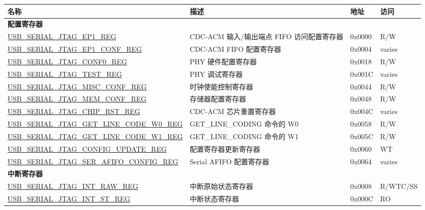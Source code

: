 \begin{longtable}{ | p{7.4cm} | p{5.2cm} | p{1.2cm} | p{1.7cm} | }
\hline\rowcolor{lightgray}
\textbf{名称} & \textbf{描述} &  \textbf{地址} & \textbf{访问} \\ \hline
\endhead
\multicolumn{4}{|l|}{\textbf{配置寄存器}} \\ \hline
\hyperref[regdesc:USBSERIALJTAGEP1REG]{USB\_SERIAL\_JTAG\_EP1\_REG} & CDC-ACM 输入/输出端点 FIFO 访问配置寄存器 & 0x0000 & R/W \\ \hline
\hyperref[regdesc:USBSERIALJTAGEP1CONFREG]{USB\_SERIAL\_JTAG\_EP1\_CONF\_REG} & CDC-ACM FIFO 配置寄存器 & 0x0004 & varies \\ \hline
\hyperref[regdesc:USBSERIALJTAGCONF0REG]{USB\_SERIAL\_JTAG\_CONF0\_REG} & PHY 硬件配置寄存器 & 0x0018 & R/W \\ \hline
\hyperref[regdesc:USBSERIALJTAGTESTREG]{USB\_SERIAL\_JTAG\_TEST\_REG} & PHY 调试寄存器 & 0x001C & varies \\ \hline
\hyperref[regdesc:USBSERIALJTAGMISCCONFREG]{USB\_SERIAL\_JTAG\_MISC\_CONF\_REG} & 时钟使能控制寄存器 & 0x0044 & R/W \\ \hline
\hyperref[regdesc:USBSERIALJTAGMEMCONFREG]{USB\_SERIAL\_JTAG\_MEM\_CONF\_REG} & 存储器配置寄存器 & 0x0048 & R/W \\ \hline
\hyperref[regdesc:USBSERIALJTAGCHIPRSTREG]{USB\_SERIAL\_JTAG\_CHIP\_RST\_REG} & CDC-ACM 芯片重置寄存器 & 0x004C & varies \\ \hline
\hyperref[regdesc:USBSERIALJTAGGETLINECODEW0REG]{USB\_SERIAL\_JTAG\_GET\_LINE\_CODE\_W0\_REG} & GET\_LINE\_CODING 命令的 W0 & 0x0058 & R/W \\ \hline
\hyperref[regdesc:USBSERIALJTAGGETLINECODEW1REG]{USB\_SERIAL\_JTAG\_GET\_LINE\_CODE\_W1\_REG} & GET\_LINE\_CODING 命令的 W1 & 0x005C & R/W \\ \hline
\hyperref[regdesc:USBSERIALJTAGCONFIGUPDATEREG]{USB\_SERIAL\_JTAG\_CONFIG\_UPDATE\_REG} & 配置寄存器更新寄存器 & 0x0060 & WT \\ \hline
\hyperref[regdesc:USBSERIALJTAGSERAFIFOCONFIGREG]{USB\_SERIAL\_JTAG\_SER\_AFIFO\_CONFIG\_REG} & Serial AFIFO 配置寄存器 & 0x0064 & varies \\ \hline
\multicolumn{4}{|l|}{\textbf{中断寄存器}} \\ \hline
\hyperref[regdesc:USBSERIALJTAGINTRAWREG]{USB\_SERIAL\_JTAG\_INT\_RAW\_REG} & 中断原始状态寄存器 & 0x0008 & R/WTC/SS \\ \hline
\hyperref[regdesc:USBSERIALJTAGINTSTREG]{USB\_SERIAL\_JTAG\_INT\_ST\_REG} & 中断状态寄存器 & 0x000C & RO \\ \hline

\end{longtable}
